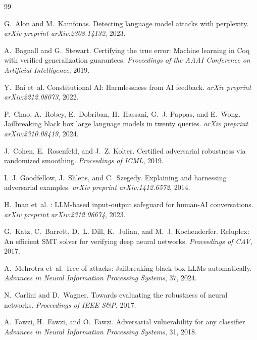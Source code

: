 \documentclass[11pt]{article}
\begin{document}
\begin{thebibliography}{99}

G.~Alon and M.~Kamfonas.
\newblock Detecting language model attacks with perplexity.
\newblock \emph{arXiv preprint arXiv:2308.14132}, 2023.

A.~Bagnall and G.~Stewart.
\newblock Certifying the true error: Machine learning in {Coq} with
  verified generalization guarantees.
\newblock \emph{Proceedings of the AAAI Conference on Artificial
Intelligence}, 2019.

Y.~Bai et~al.
\newblock Constitutional {AI}: Harmlessness from {AI} feedback.
\newblock \emph{arXiv preprint arXiv:2212.08073}, 2022.

P.~Chao, A.~Robey, E.~Dobriban, H.~Hassani, G.~J. Pappas, and
E.~Wong.
\newblock Jailbreaking black box large language models in twenty queries.
\newblock \emph{arXiv preprint arXiv:2310.08419}, 2024.

J.~Cohen, E.~Rosenfeld, and J.~Z. Kolter.
\newblock Certified adversarial robustness via randomized smoothing.
\newblock \emph{Proceedings of ICML}, 2019.

I.~J. Goodfellow, J.~Shlens, and C.~Szegedy.
\newblock Explaining and harnessing adversarial examples.
\newblock \emph{arXiv preprint arXiv:1412.6572}, 2014.

H.~Inan et~al.
: {LLM}-based input-output safeguard for
  human-{AI} conversations.
\newblock \emph{arXiv preprint arXiv:2312.06674}, 2023.

G.~Katz, C.~Barrett, D.~L. Dill, K.~Julian, and
M.~J. Kochenderfer.
\newblock Reluplex: An efficient {SMT} solver for verifying deep neural
  networks.
\newblock \emph{Proceedings of CAV}, 2017.

A.~Mehrotra et~al.
\newblock Tree of attacks: Jailbreaking black-box {LLMs} automatically.
\newblock \emph{Advances in Neural Information Processing Systems}, 37,
2024.

N.~Carlini and D.~Wagner.
\newblock Towards evaluating the robustness of neural networks.
\newblock \emph{Proceedings of IEEE S\&P}, 2017.

A.~Fawzi, H.~Fawzi, and O.~Fawzi.
\newblock Adversarial vulnerability for any classifier.
\newblock \emph{Advances in Neural Information Processing Systems}, 31, 2018.


\end{thebibliography}
\end{document}
